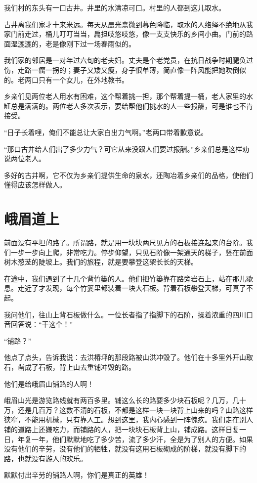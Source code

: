 \documentclass[12pt,UTF-8,openany]{ctexbook}
\begin{document}
\begin{Large}
    
    我们村的东头有一口古井。井里的水清凉可口。村里的人都到这儿取水。
    
    古井离我们家才十来米远。每天从晨光熹微到暮色降临，取水的人络绎不绝地从我家门前走过，桶儿叮叮当当，扁担吱悠吱悠，像一支支快乐的乡间小曲。门前的路面湿漉漉的，老是像刚下过一场春雨似的。
    
    我们家的邻居是一对年过六旬的老夫妇。丈夫是个老党员，在抗日战争时期腿负过伤，走路一瘸一拐的；妻子又矮又瘦，身子很单薄，简直像一阵风能把她吹倒似的。老两口只有一个女儿，在外地教书。
    
    乡亲们见两位老人用水有困难，这个帮着挑一担，那个帮着提一桶，老人家里的水缸总是满满的。两位老人多次表示，要给帮他们挑水的人一些报酬，可是谁也不肯接受。
    
    “日子长着哩，俺们不能总让大家白出力气啊。”老两口带着歉意说。
    
    “那口古井给人们出了多少力气？可它从来没跟人们要过报酬。”乡亲们总是这样劝说两位老人。
    
    多好的古井啊，它不仅为乡亲们提供生命的泉水，还陶冶着乡亲们的品格，使他们懂得应该怎样做人。
    
\end{Large}

\chapter{峨眉道上}

\begin{Large}
    
    前面没有平坦的路了。所谓路，就是用一块块两尺见方的石板接连起来的台阶。我们一步一步向上爬，非常吃力。停步仰望，只见石阶像一架通天的梯子，竖在前面树木葱茏的陡坡上。我们的旅程，就是要攀登这架长长的天梯。
    
    在途中，我们遇到了十几个背竹篓的人。他们把竹篓靠在路旁岩石上，站在那儿歇息。走近了才发现，每个竹篓里都装着一块大石板。背着石板攀登天梯，可真了不起。
    
    我问他们，往山上背石板做什么。一位长者指了指脚下的石阶，操着浓重的四川口音回答说：“干这个！”
    
    “铺路？”
    
    他点了点头，告诉我说：去洪椿坪的那段路被山洪冲毁了。他们在十多里外开山取石，凿成了石板，背上山去重铺冲毁的路。
    
    他们是给峨眉山铺路的人啊！
    
    峨眉山光是游览路线就有两百多里。铺这么长的路要多少块石板呢？几万，几十万，还是几百万？这数不清的石板，不都是这样一块一块背上山来的吗？山路这样狭窄，不能用机械，只有靠人工。想到这里，我内心感到一阵愧疚。我们走在别人铺的道路上还嫌吃力，而铺路的人，把一块块石板背上山，铺成路。这样日复一日，年复一年，他们默默地吃了多少苦，流了多少汗，全是为了别人的方便。如果没有他们的辛劳，没有他们的牺牲，就没有这用石板砌成的阶梯，就没有脚下的路，也就没有游人的欢乐。
    
    默默付出辛劳的铺路人啊，你们是真正的英雄！
    
\end{Large}
\end{document}
